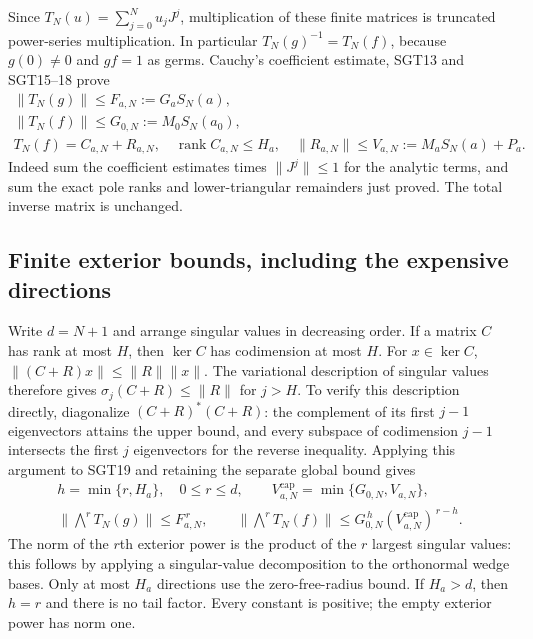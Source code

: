 \documentclass[10pt]{article}
\begin{document}
Since $T_N(u)=\sum_{j=0}^Nu_jJ^j$, multiplication of these finite
matrices is truncated power-series multiplication. In particular
$T_N(g)^{-1}=T_N(f)$, because $g(0)\ne0$ and $gf=1$ as germs.
Cauchy's coefficient estimate, SGT13 and SGT15--18 prove
\[
\begin{gathered}
 \|T_N(g)\|\le F_{a,N}:=G_aS_N(a),\\
 \|T_N(f)\|\le G_{0,N}:=M_0S_N(a_0),\\
 T_N(f)=C_{a,N}+R_{a,N},\quad
 \operatorname{rank}C_{a,N}\le H_a,\quad
 \|R_{a,N}\|\le V_{a,N}:=M_aS_N(a)+P_a.
\end{gathered}\tag{SGT19}
\]
Indeed sum the coefficient estimates times $\|J^j\|\le1$ for the
analytic terms, and sum the exact pole ranks and lower-triangular
remainders just proved. The total inverse matrix is unchanged.

\subsection{Finite exterior bounds, including the expensive directions}

Write $d=N+1$ and arrange singular values in decreasing order.
If a matrix $C$ has rank at most $H$, then $\ker C$ has codimension
at most $H$. For $x\in\ker C$, $\|(C+R)x\|\le\|R\|\|x\|$.
The variational description of singular values therefore gives
$\sigma_j(C+R)\le\|R\|$ for $j>H$. To verify this description
directly, diagonalize $(C+R)^*(C+R)$: the complement of its first
$j-1$ eigenvectors attains the upper bound, and every subspace of
codimension $j-1$ intersects the first $j$ eigenvectors for the
reverse inequality. Applying this argument to SGT19 and retaining
the separate global bound gives
\[
\begin{gathered}
 h=\min\{r,H_a\},\quad 0\le r\le d,\qquad
 V_{a,N}^{\mathrm{cap}}=\min\{G_{0,N},V_{a,N}\},\\
 \|\bigwedge^rT_N(g)\|\le F_{a,N}^{\,r},\qquad
 \|\bigwedge^rT_N(f)\|
       \le G_{0,N}^{\,h}(V_{a,N}^{\mathrm{cap}})^{\,r-h}.
\end{gathered}\tag{SGT20}
\]
The norm of the $r$th exterior power is the product of the $r$
largest singular values: this follows by applying a singular-value
decomposition to the orthonormal wedge bases. Only at most $H_a$
directions use the zero-free-radius bound. If $H_a>d$, then
$h=r$ and there is no tail factor. Every constant is positive;
the empty exterior power has norm one.
\end{document}
